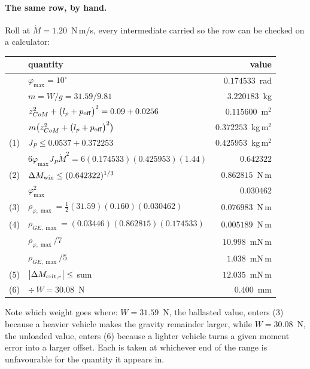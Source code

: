 \documentclass[10pt]{article}
\newcommand{\lpo}{\bigl(l_p + p_{\rm off}\bigr)}
\begin{document}
\paragraph{The same row, by hand.}
Roll at $\dot M = 1.20$~N\,m/s, every intermediate carried so the row can
be checked on a calculator:

\begin{center}\small
\begin{tabular}{@{}rlr@{}}
\toprule
 & quantity & value \\
\midrule
   & $\varphi_{\max} = 10^\circ$ & $0.174533$~rad \\
   & $m = W/g = 31.59/9.81$ & $3.220183$~kg \\
   & $z_{CoM}^2 + \lpo^2 = 0.09 + 0.0256$ & $0.115600$~m$^2$ \\
   & $m\bigl(z_{CoM}^2+\lpo^2\bigr)$ & $0.372253$~kg\,m$^2$ \\
(1)& $J_P \le 0.0537 + 0.372253$ & $0.425953$~kg\,m$^2$ \\
\midrule
   & $6\varphi_{\max}J_P\dot M^{2}
       = 6(0.174533)(0.425953)(1.44)$ & $0.642322$ \\
(2)& $\Delta M_{\rm win} \le (0.642322)^{1/3}$ & $0.862815$~N\,m \\
\midrule
   & $\varphi_{\max}^2$ & $0.030462$ \\
(3)& $\rho_{\varphi,\max}
       = \tfrac12(31.59)(0.160)(0.030462)$ & $0.076983$~N\,m \\
(4)& $\rho_{GE,\max} = (0.03446)(0.862815)(0.174533)$ & $0.005189$~N\,m \\
\midrule
   & $\rho_{\varphi,\max}/7$ & $10.998$~mN\,m \\
   & $\rho_{GE,\max}/5$ & $\phantom{0}1.038$~mN\,m \\
(5)& $\bigl|\Delta M_{{\rm crit},e}\bigr| \le$ sum & $12.035$~mN\,m \\
(6)& $\div\,W = 30.08$~N & $0.400$~mm \\
\bottomrule
\end{tabular}
\end{center}

Note which weight goes where: $W = 31.59$~N, the ballasted value,
enters (3) because a heavier vehicle makes the gravity remainder
larger, while $W = 30.08$~N, the unloaded value, enters (6) because a
lighter vehicle turns a given moment error into a larger offset. Each
is taken at whichever end of the range is unfavourable for the quantity
it appears in.
\end{document}
